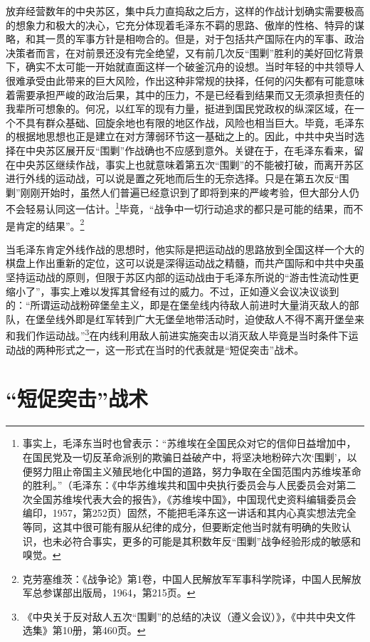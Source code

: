 放弃经营数年的中央苏区，集中兵力直捣敌之后方，这样的作战计划确实需要极高的想象力和极大的决心，它充分体现着毛泽东不羁的思路、傲岸的性格、特异的谋略，和其一贯的军事方针是相吻合的。但是，对于包括共产国际在内的军事、政治决策者而言，在对前景还没有完全绝望，又有前几次反“围剿”胜利的美好回忆背景下，确实不太可能一开始就直面这样一个破釜沉舟的设想。当时年轻的中共领导人很难承受由此带来的巨大风险，作出这种非常规的抉择，任何的闪失都有可能意味着需要承担严峻的政治后果，其中的压力，不是已经看到结果而又无须承担责任的我辈所可想象的。何况，以红军的现有力量，挺进到国民党政权的纵深区域，在一个不具有群众基础、回旋余地也有限的地区作战，风险也相当巨大。毕竟，毛泽东的根据地思想也正是建立在对方薄弱环节这一基础之上的。因此，中共中央当时选择在中央苏区展开反“围剿”作战确也不应感到意外。关键在于，在毛泽东看来，留在中央苏区继续作战，事实上也就意味着第五次“围剿”的不能被打破，而离开苏区进行外线的运动战，可以说是置之死地而后生的无奈选择。只是在第五次反“围剿”刚刚开始时，虽然人们普遍已经意识到了即将到来的严峻考验，但大部分人仍不会轻易认同这一估计。\footnote{事实上，毛泽东当时也曾表示：“苏维埃在全国民众对它的信仰日益增加中，在国民党及一切反革命派别的欺骗日益破产中，将坚决地粉碎六次‘围剿’，以便努力阻止帝国主义殖民地化中国的道路，努力争取在全国范围内苏维埃革命的胜利。”（毛泽东：《中华苏维埃共和国中央执行委员会与人民委员会对第二次全国苏维埃代表大会的报告》，《苏维埃中国》，中国现代史资料编辑委员会编印，1957，第252页）固然，不能把毛泽东这一讲话和其内心真实想法完全等同，这其中很可能有服从纪律的成分，但要断定他当时就有明确的失败认识，也未必符合事实，更多的可能是其积数年反“围剿”战争经验形成的敏感和嗅觉。}毕竟，“战争中一切行动追求的都只是可能的结果，而不是肯定的结果”。\footnote{克劳塞维茨：《战争论》第1卷，中国人民解放军军事科学院译，中国人民解放军总参谋部出版局，1964，第215页。}


当毛泽东肯定外线作战的思想时，他实际是把运动战的思路放到全国这样一个大的棋盘上作出重新的定位，这可以说是深得运动战之精髓，而共产国际和中共中央虽坚持运动战的原则，但限于苏区内部的运动战由于毛泽东所说的“游击性流动性更缩小了”，事实上难以发挥其曾经有过的威力。不过，正如遵义会议决议谈到的：“所谓运动战粉碎堡垒主义，即是在堡垒线内待敌人前进时大量消灭敌人的部队，在堡垒线外即是红军转到广大无堡垒地带活动时，迫使敌人不得不离开堡垒来和我们作运动战。”\footnote{《中央关于反对敌人五次“围剿”的总结的决议（遵义会议）》，《中共中央文件选集》第10册，第460页。}在内线利用敌人前进实施突击以消灭敌人毕竟是当时条件下运动战的两种形式之一，这一形式在当时的代表就是“短促突击”战术。

\section{“短促突击”战术}


